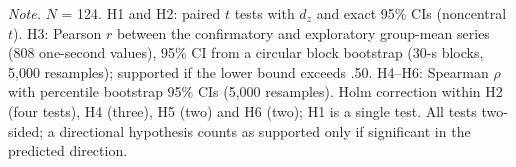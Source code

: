 \begin{table}[tbp]
\begin{threeparttable}
\begin{tabular}{@{}l>{\raggedright\arraybackslash}p{3.0cm}cllll@{}}
\bottomrule
\end{tabular}
\vspace{4pt}
\begin{tablenotes}
{\small\textit{Note.} $N$ = 124. H1 and H2: paired $t$ tests with $d_z$ and exact 95\% CIs (noncentral $t$). H3: Pearson $r$ between the confirmatory and exploratory group-mean series (808 one-second values), 95\% CI from a circular block bootstrap (30-s blocks, 5,000 resamples); supported if the lower bound exceeds .50. H4--H6: Spearman $\rho$ with percentile bootstrap 95\% CIs (5,000 resamples). Holm correction within H2 (four tests), H4 (three), H5 (two) and H6 (two); H1 is a single test. All tests two-sided; a directional hypothesis counts as supported only if significant in the predicted direction.}
\end{tablenotes}
\end{threeparttable}
\end{table}
